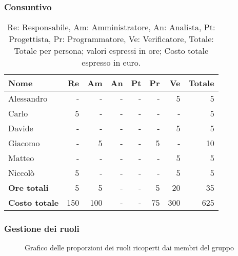 \subsubsection{Consuntivo}
\begin{table}[H]
	\centering
	\begin{tabular}{l|r|r|r|r|r|r|r}
		\textbf{Nome}         & \textbf{Re} & \textbf{Am} & \textbf{An} & \textbf{Pt} & \textbf{Pr} & \textbf{Ve} & \textbf{Totale} \\
		\hline
		Alessandro            & -           & -           & -           & -           & -           & 5           & 5              \\
		Carlo                 & 5           & -           & -           & -           & -           & -           & 5              \\
		Davide                & -           & -           & -           & -           & -           & 5           & 5              \\
		Giacomo               & -           & 5           & -           & -           & 5           & -           & 10              \\
		Matteo                & -           & -           & -           & -           & -           & 5           & 5              \\
		Niccolò               & 5           & -           & -           & -           & -            & 5           & 5              \\
		\hline
		\textbf{Ore totali}   & 5           & 5           & -           & -          & 5          & 20          & 35              \\
		\textbf{Costo totale} & 150         & 100         & -           & -         & 75         & 300         & 625
	\end{tabular}
	\caption{Re: Responsabile, Am: Amministratore, An: Analista, Pt: Progettista,
		Pr: Programmatore, Ve: Verificatore, Totale: Totale per persona; valori espressi in ore; Costo totale espresso in euro.}
\end{table}

\subsubsection{Gestione dei ruoli}
\begin{figure}[h]
	\centering
	\caption{Grafico delle proporzioni dei ruoli ricoperti dai membri del gruppo}
\end{figure}

